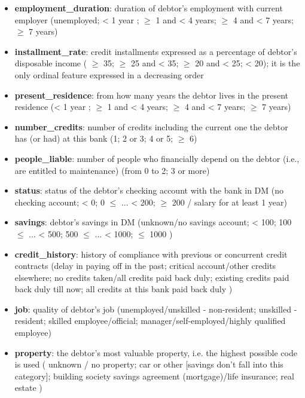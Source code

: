 \documentclass[letterpaper]{article}
\begin{document}
	\begin{itemize}
		\item \textbf{employment\_duration}:  duration of debtor’s employment with current employer (unemployed; < 1 year ; $\geq$ 1 and < 4 years; $\geq$ 4 and < 7 years; $\geq$ 7 years)
		\item \textbf{installment\_rate}: credit installments expressed as a percentage of debtor’s disposable income ( $\geq$ 35; $\geq$ 25 and < 35; $\geq$ 20 and < 25; < 20); it is the only ordinal feature expressed in a decreasing order
		\item \textbf{present\_residence}: from how many years the debtor lives in the present residence (< 1 year ; $\geq$ 1 and < 4 years; $\geq$ 4 and < 7 years; $\geq$ 7 years)
		\item \textbf{number\_credits}:  number of credits including the current one the debtor has (or had) at this bank (1; 2 or 3; 4 or 5; $\geq$ 6)
		\item \textbf{people\_liable}: number of people who financially depend on the debtor (i.e., are entitled to maintenance) (from 0 to 2; 3 or more)
		\item \textbf{status\footnotemark}: status of the debtor’s checking account with the bank in DM (no checking account; < 0; 0 $\leq$ ... < 200; $\geq$ 200 / salary for at least 1 year)
		\item \textbf{savings\footnotemark[\value{footnote}]}: debtor’s savings in DM (unknown/no savings account; <  100; 100 $\leq$ ... <  500; 500 $\leq$ ... < 1000; $\leq$ 1000 )
		\item \textbf{credit\_history\footnotemark[\value{footnote}]}:  history of compliance with previous or concurrent credit contracts (delay in paying off in the past; critical account/other credits elsewhere; no credits taken/all credits paid back duly; existing credits paid back duly till now; all credits at this bank paid back duly )
		\item \textbf{job}: quality of debtor’s job (unemployed/unskilled - non-resident; unskilled - resident; skilled employee/official; manager/self-employed/highly qualified employee)
		\item \textbf{property}:  the debtor’s most valuable property, i.e. the highest possible code is used ( unknown / no property; car or other [savings don't fall into this category]; building society savings agreement (mortgage)/life insurance; real estate )
	\end{itemize}
\end{document}
